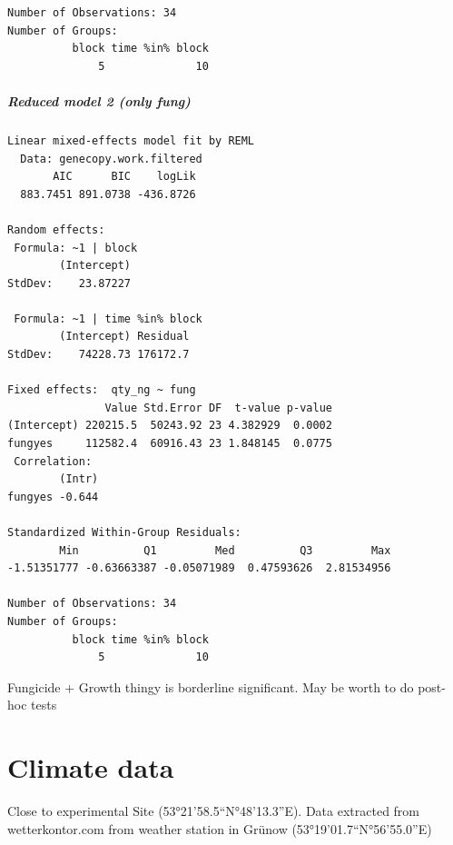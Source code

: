 \documentclass[twoside,12pt,final]{ucthesis-CA2012}
\newenvironment{Shaded}{}{}
\newcommand{\KeywordTok}[1]{\textcolor[rgb]{0.00,0.44,0.13}{\textbf{{#1}}}}
\newcommand{\DecValTok}[1]{\textcolor[rgb]{0.25,0.63,0.44}{{#1}}}
\newcommand{\StringTok}[1]{\textcolor[rgb]{0.25,0.44,0.63}{{#1}}}
\newcommand{\CommentTok}[1]{\textcolor[rgb]{0.38,0.63,0.69}{\textit{{#1}}}}
\newcommand{\NormalTok}[1]{{#1}}
\newcommand{\OperatorTok}[1]{\textcolor[rgb]{0.00,0.44,0.13}{\textbf{{#1}}}}
\begin{document}
\begin{ucmainmatter}
\begin{verbatim}
Number of Observations: 34
Number of Groups: 
          block time %in% block 
              5              10 
\end{verbatim}
\hypertarget{reduced-model-2-only-fung}{%
\paragraph{Reduced model 2 (only fung)}\label{reduced-model-2-only-fung}}
\begin{verbatim}
Linear mixed-effects model fit by REML
  Data: genecopy.work.filtered 
       AIC      BIC    logLik
  883.7451 891.0738 -436.8726

Random effects:
 Formula: ~1 | block
        (Intercept)
StdDev:    23.87227

 Formula: ~1 | time %in% block
        (Intercept) Residual
StdDev:    74228.73 176172.7

Fixed effects:  qty_ng ~ fung 
               Value Std.Error DF  t-value p-value
(Intercept) 220215.5  50243.92 23 4.382929  0.0002
fungyes     112582.4  60916.43 23 1.848145  0.0775
 Correlation: 
        (Intr)
fungyes -0.644

Standardized Within-Group Residuals:
        Min          Q1         Med          Q3         Max 
-1.51351777 -0.63663387 -0.05071989  0.47593626  2.81534956 

Number of Observations: 34
Number of Groups: 
          block time %in% block 
              5              10 
\end{verbatim}
Fungicide + Growth thingy is borderline significant. May be worth to do post-hoc tests

\hypertarget{climate-data}{%
\chapter{Climate data}\label{climate-data}}

Close to experimental Site (53°21'58.5``N°48'13.3''E). Data extracted from wetterkontor.com from weather station in Grünow (53°19'01.7``N°56'55.0''E)
\begin{Shaded}
\end{Shaded}
\begin{verbatim}


\end{verbatim}
\end{ucmainmatter}
\end{document}
